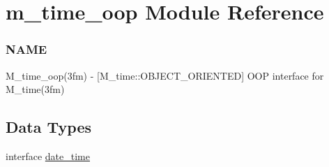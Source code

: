 \hypertarget{namespacem__time__oop}{}\section{m\+\_\+time\+\_\+oop Module Reference}
\label{namespacem__time__oop}


\subsubsection*{N\+A\+ME}

M\+\_\+time\+\_\+oop(3fm) -\/ \mbox{[}M\+\_\+time\+::\+O\+B\+J\+E\+C\+T\+\_\+\+O\+R\+I\+E\+N\+T\+ED\mbox{]} O\+OP interface for M\+\_\+time(3fm)  


\subsection*{Data Types}
\begin{DoxyCompactItemize}
\item 
interface \mbox{\hyperlink{structm__time__oop_1_1date__time}{date\+\_\+time}}
\end{DoxyCompactItemize}
